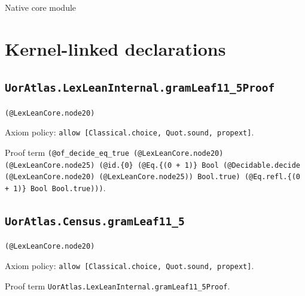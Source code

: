 \documentclass[11pt]{article}
\begin{document}
\begin{center}{\LARGE Native core module}\end{center}
\section*{Kernel-linked declarations}
\subsection*{\texttt{UorAtlas.LexLeanInternal.gramLeaf11\_5Proof}}
\noindent\texttt{(@LexLeanCore.node20)}\par
\noindent Axiom policy: \texttt{allow [Classical.choice, Quot.sound, propext]}.\par
\noindent Proof term \texttt{(@of\_decide\_eq\_true (@LexLeanCore.node20) (@LexLeanCore.node25) (@id.\{0\} (@Eq.\{(0 + 1)\} Bool (@Decidable.decide (@LexLeanCore.node20) (@LexLeanCore.node25)) Bool.true) (@Eq.refl.\{(0 + 1)\} Bool Bool.true)))}.\par
\subsection*{\texttt{UorAtlas.Census.gramLeaf11\_5}}
\noindent\texttt{(@LexLeanCore.node20)}\par
\noindent Axiom policy: \texttt{allow [Classical.choice, Quot.sound, propext]}.\par
\noindent Proof term \texttt{UorAtlas.LexLeanInternal.gramLeaf11\_5Proof}.\par
\end{document}
